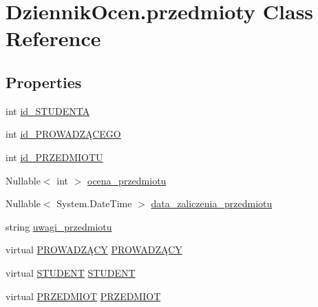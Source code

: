 \hypertarget{class_dziennik_ocen_1_1przedmioty}{}\section{Dziennik\+Ocen.\+przedmioty Class Reference}
\label{class_dziennik_ocen_1_1przedmioty}
\subsection*{Properties}
\begin{DoxyCompactItemize}
\item 
int \hyperlink{class_dziennik_ocen_1_1przedmioty_acf2bf2404f6638216b43585291284ced}{id\+\_\+\+S\+T\+U\+D\+E\+N\+TA}
\item 
int \hyperlink{class_dziennik_ocen_1_1przedmioty_a39c87728c6eab1c7fad682e7b7a3b0a3}{id\+\_\+\+P\+R\+O\+W\+A\+D\+ZĄ\+C\+E\+GO}
\item 
int \hyperlink{class_dziennik_ocen_1_1przedmioty_af0aac31a378cd8cf96950d96014e593b}{id\+\_\+\+P\+R\+Z\+E\+D\+M\+I\+O\+TU}
\item 
Nullable$<$ int $>$ \hyperlink{class_dziennik_ocen_1_1przedmioty_ad2e8facb4840f277c9259d0eef4eb2ff}{ocena\+\_\+przedmiotu}
\item 
Nullable$<$ System.\+Date\+Time $>$ \hyperlink{class_dziennik_ocen_1_1przedmioty_a8a21ec8a325acce447b7f5097bbdabce}{data\+\_\+zaliczenia\+\_\+przedmiotu}
\item 
string \hyperlink{class_dziennik_ocen_1_1przedmioty_adba6f83bca19908af047785071edc6d0}{uwagi\+\_\+przedmiotu}
\item 
virtual \hyperlink{class_dziennik_ocen_1_1_p_r_o_w_a_d_z_xC4_x84_c_y}{P\+R\+O\+W\+A\+D\+ZĄ\+CY} \hyperlink{class_dziennik_ocen_1_1przedmioty_ad507c79b4aef0148095df4d4da8c92eb}{P\+R\+O\+W\+A\+D\+ZĄ\+CY}
\item 
virtual \hyperlink{class_dziennik_ocen_1_1_s_t_u_d_e_n_t}{S\+T\+U\+D\+E\+NT} \hyperlink{class_dziennik_ocen_1_1przedmioty_a4740353bef7deac31f86a1f7066cb96d}{S\+T\+U\+D\+E\+NT}
\item 
virtual \hyperlink{class_dziennik_ocen_1_1_p_r_z_e_d_m_i_o_t}{P\+R\+Z\+E\+D\+M\+I\+OT} \hyperlink{class_dziennik_ocen_1_1przedmioty_a69dbef938111a031a54990e72a3448a3}{P\+R\+Z\+E\+D\+M\+I\+OT}
\end{DoxyCompactItemize}


